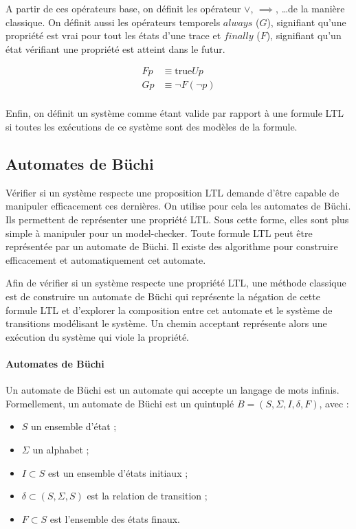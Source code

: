 A partir de ces opérateurs base, on définit les opérateur \(\lor\),
\(\implies\), \dots de la manière classique. On définit aussi les
opérateurs temporels \(always\) (\(G\)), signifiant qu'une propriété est
vrai pour tout les états d'une trace et \(finally\) (\(F\)), signifiant
qu'un état vérifiant une propriété est atteint dans le futur.

\[
\begin{aligned}
F p & \equiv \text{true} U p \\
G p & \equiv \lnot F (\lnot p)\\
\end{aligned}
\]

Enfin, on définit un système comme étant valide par rapport à une
formule LTL si toutes les exécutions de ce système sont des modèles de
la formule.

\subsection{Automates de Büchi}

Vérifier si un système respecte une proposition LTL demande d'être capable de
manipuler efficacement ces dernières. On utilise pour cela les automates de
Büchi. Ils permettent de représenter une propriété LTL. Sous cette forme, elles
sont plus simple à manipuler pour un model-checker. Toute formule LTL peut être
représentée par un automate de Büchi. Il existe des algorithme pour construire
efficacement et automatiquement cet automate\citep{ltl2ba}.

Afin de vérifier si un système respecte une propriété LTL, une méthode classique
est de construire un automate de Büchi qui représente la négation de cette
formule LTL et d'explorer la composition entre cet automate et le système de
transitions modélisant le système. Un chemin acceptant représente alors une
exécution du système qui viole la propriété.

\paragraph{Automates de Büchi}
Un automate de Büchi est un automate qui accepte un langage de mots
infinis. Formellement, un automate de Büchi est un quintuplé
\(B = (S, \Sigma, I, \delta, F)\), avec :

\begin{itemize}
\item
  \(S\) un ensemble d'état ;
\item
  \(\Sigma\) un alphabet ;
\item
  \(I \subset S\) est un ensemble d'états initiaux ;
\item
  \(\delta \subset (S, \Sigma, S)\) est la relation de transition ;
\item
  \(F \subset S\) est l'ensemble des états finaux.
\end{itemize}

